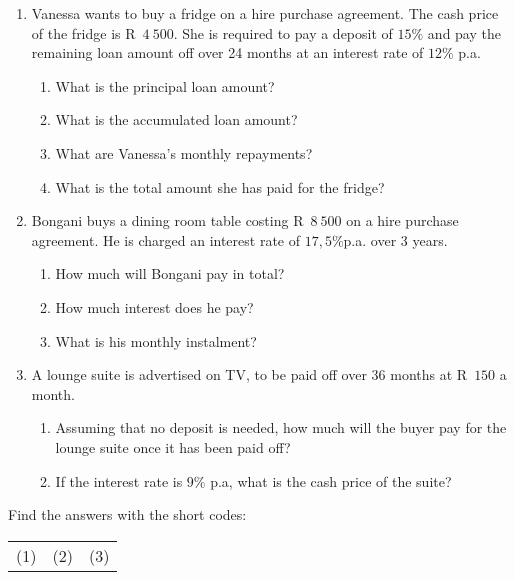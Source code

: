 \begin{exercises}{}{
    \begin{enumerate}[label=\textbf{\arabic*}.]
	\item Vanessa wants to buy a fridge on a hire purchase agreement. The cash price of the fridge is R~$4~500$. She is required to pay a deposit of $15\%$ and pay the remaining loan amount off over 24 months at an interest rate of $12\%$ p.a.
	\begin{enumerate}[noitemsep, label=\textbf{(\alph*)} ]
	    \item What is the principal loan amount?
	    \item What is the accumulated loan amount?
	    \item What are Vanessa’s monthly repayments?
	    \item What is the total amount she has paid for the fridge?
	\end{enumerate}


	\item Bongani buys a dining room table costing R~$8~500$ on a hire purchase agreement. He is charged an interest rate of $17,5\%$p.a. over 3 years.
	\begin{enumerate}[noitemsep, label=\textbf{(\alph*)} ]
	    \item How much will Bongani pay in total?
	    \item How much interest does he pay?
	    \item What is his monthly instalment?
	\end{enumerate}

	\item A lounge suite is advertised on TV, to be paid off over 36 months at R~$150$ a month.
	\begin{enumerate}[noitemsep, label=\textbf{(\alph*)} ]
	    \item Assuming that no deposit is needed, how much will the buyer pay for the lounge suite once it has been paid off?
	    \item If the interest rate is $9\%$ p.a, what is the cash price of the suite?\\
	\end{enumerate}
    \end{enumerate}
\practiceinfo
    Find the answers with the short codes:\\
    \begin{tabularx}{\textwidth}{ XXX }
	(1)	&	(2)	&	(3)\\
    \end{tabularx}
}
\end{exercises}


